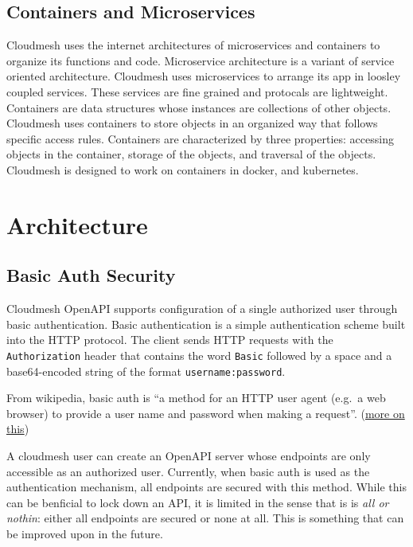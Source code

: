 \subsection{Containers and
Microservices}\label{containers-and-microservices}

Cloudmesh uses the internet architectures of microservices and
containers to organize its functions and code. Microservice architecture
is a variant of service oriented architecture. Cloudmesh uses
microservices to arrange its app in loosley coupled services. These
services are fine grained and protocals are lightweight. Containers are
data structures whose instances are collections of other objects.
Cloudmesh uses containers to store objects in an organized way that
follows specific access rules. Containers are characterized by three
properties: accessing objects in the container, storage of the objects,
and traversal of the objects. Cloudmesh is designed to work on
containers in docker, and kubernetes.

\section{Architecture}\label{architecture}

\subsection{Basic Auth Security}\label{basic-auth-security}

Cloudmesh OpenAPI supports configuration of a single authorized user
through basic authentication. Basic authentication is a simple
authentication scheme built into the HTTP protocol. The client sends
HTTP requests with the \texttt{Authorization} header that contains the
word \texttt{Basic} followed by a space and a base64-encoded string of
the format \texttt{username:password}.

From wikipedia, basic auth is ``a method for an HTTP user agent (e.g.~a
web browser) to provide a user name and password when making a
request''. (\href{https://github.com/cloudmesh/cloudmesh-openapi}{more
on this})

A cloudmesh user can create an OpenAPI server whose endpoints are only
accessible as an authorized user. Currently, when basic auth is used as
the authentication mechanism, all endpoints are secured with this
method. While this can be benficial to lock down an API, it is limited
in the sense that is is {\em all or nothin}: either all endpoints are
secured or none at all. This is something that can be improved upon in
the future.

